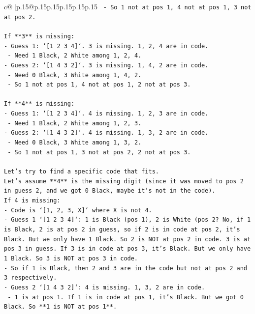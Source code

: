 \documentclass{article}
\begin{document}
{\begin{supertabular}{c@{$\;$}|p{.15\linewidth}@{}p{.15\linewidth}p{.15\linewidth}p{.15\linewidth}p{.15\linewidth}p{.15\linewidth}}
{{{\texttt{  {-} So 1 not at pos 1, 4 not at pos 1, 3 not at pos 2.} \\
\\ 
\texttt{If **3** is missing:} \\
\texttt{{-} Guess 1: `{[}1 2 3 4{]}`. 3 is missing. 1, 2, 4 are in code.} \\
\texttt{  {-} Need 1 Black, 2 White among 1, 2, 4.} \\
\texttt{{-} Guess 2: `{[}1 4 3 2{]}`. 3 is missing. 1, 4, 2 are in code.} \\
\texttt{  {-} Need 0 Black, 3 White among 1, 4, 2.} \\
\texttt{  {-} So 1 not at pos 1, 4 not at pos 1, 2 not at pos 3.} \\
\\ 
\texttt{If **4** is missing:} \\
\texttt{{-} Guess 1: `{[}1 2 3 4{]}`. 4 is missing. 1, 2, 3 are in code.} \\
\texttt{  {-} Need 1 Black, 2 White among 1, 2, 3.} \\
\texttt{{-} Guess 2: `{[}1 4 3 2{]}`. 4 is missing. 1, 3, 2 are in code.} \\
\texttt{  {-} Need 0 Black, 3 White among 1, 3, 2.} \\
\texttt{  {-} So 1 not at pos 1, 3 not at pos 2, 2 not at pos 3.} \\
\\ 
\texttt{Let's try to find a specific code that fits.} \\
\texttt{Let's assume **4** is the missing digit (since it was moved to pos 2 in guess 2, and we got 0 Black, maybe it's not in the code).} \\
\texttt{If 4 is missing:} \\
\texttt{{-} Code is `{[}1, 2, 3, X{]}` where X is not 4.} \\
\texttt{{-} Guess 1 `{[}1 2 3 4{]}`: 1 is Black (pos 1), 2 is White (pos 2? No, if 1 is Black, 2 is at pos 2 in guess, so if 2 is in code at pos 2, it's Black. But we only have 1 Black. So 2 is NOT at pos 2 in code. 3 is at pos 3 in guess. If 3 is in code at pos 3, it's Black. But we only have 1 Black. So 3 is NOT at pos 3 in code.} \\
\texttt{{-} So if 1 is Black, then 2 and 3 are in the code but not at pos 2 and 3 respectively.} \\
\texttt{{-} Guess 2 `{[}1 4 3 2{]}`: 4 is missing. 1, 3, 2 are in code.} \\
\texttt{  {-} 1 is at pos 1. If 1 is in code at pos 1, it's Black. But we got 0 Black. So **1 is NOT at pos 1**.} \\
}}}
\end{supertabular}}
\end{document}
